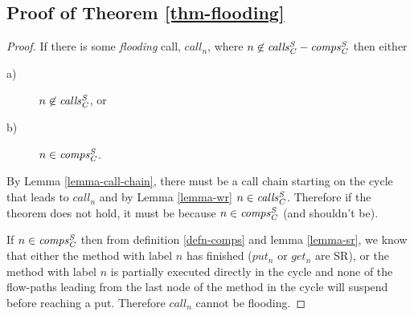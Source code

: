 \subsection{Proof of Theorem \ref{thm-flooding}}
\begin{proof}
If there is some \emph{flooding} call, $call_n$, where $n \not\in {\ensuremath{\mathit{calls_C^{S}}}}-{\mathit{comps_C^{S}}}$ then either
\begin{description}
\item[a)] $n \not\in {\ensuremath{\mathit{calls_C^{S}}}}$, or
\item[b)] $n \in {\ensuremath{\mathit{comps_C^{S}}}}$.
\end{description}
By Lemma \ref{lemma-call-chain}, there must be a call chain starting on the 
cycle that leads to $call_n$ and by Lemma \ref{lemma-wr} $n \in {\ensuremath{\mathit{calls_C^{S}}}}$. 
Therefore if the theorem does not hold, it must be because $n \in {\ensuremath{\mathit{comps_C^{S}}}}$ 
(and shouldn't be).

If $n \in {\ensuremath{\mathit{comps_C^{S}}}}$ then from definition \ref{defn-comps} and lemma
\ref{lemma-sr}, we know that either the method with label $n$ has
finished ($put_n$ or $get_n$ are SR), or the method with label $n$ is
partially executed directly in the cycle and none of the flow-paths
leading from the last node of the method in the cycle will suspend
before reaching a put.  Therefore $call_n$ cannot be flooding.
\end{proof}
